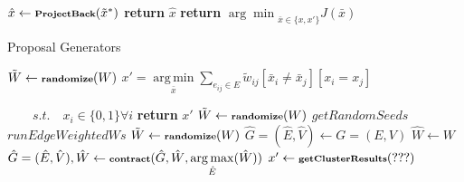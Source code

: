 \documentclass[10pt,twocolumn,letterpaper]{article}
\DeclareMathOperator*{\argmin}{arg\,min}
\DeclareMathOperator*{\argmax}{arg\,max}
\begin{document}
\begin{algorithm}
\begin{scriptsize}
\begin{algorithmic}[1]
\State $\hat{x} \gets \textbf{\scriptsize{ProjectBack}}(\tilde{x}^*)$
\State \textbf{return} $\hat{x}$
\EndProcedure
\vspace{0.3cm}
\State \textbf{return} ${\arg\min}_{\bar{x} \in \{x,x'\}}J(\bar{x})$
\EndProcedure
\end{algorithmic}
\end{scriptsize}
\end{algorithm}



\begin{algorithm}
    \begin{scriptsize}
        \caption{Proposal Generators}\label{alg:proposal_gen}   
        \begin{algorithmic}[1]
            \State $\tilde{W} \gets \textbf{\scriptsize{randomize}}(W) $
            \State $x'= \argmin\limits_{\bar{x}} \sum\limits_{e_{ij} \in E } \tilde{w}_{ij}[\bar{x}_i \neq \bar{x}_j]  [x_i = x_j]   $

            $ \quad\quad s.t.\quad x_i \in \{0, 1\} \forall i $
            \State \textbf{return} $x'$
            \EndProcedure
            \vspace{0.3cm}
            \State $\tilde{W} \gets \textbf{\scriptsize{randomize}}(W) $
            \State $ getRandomSeeds$
            \State $ runEdgeWeightedWs$
            \EndProcedure   
            \vspace{0.3cm}
            \State $\tilde{W} \gets \textbf{\scriptsize{randomize}}(W) $
            \State $\hat{G}=(\hat{E},\hat{V}) \gets G=(E,V)$
            \State $\hat{W} \gets W$
                \State $\hat{G}=(\hat{E},\hat{V}),\hat{W} \gets 
                    \textbf{\scriptsize{contract}}(\hat{G},\hat{W},  \argmax\limits_{\hat{E}}(\hat{W}) )$
            \EndWhile
            \State $x' \gets \textbf{\scriptsize{getClusterResults}}(???) $ 
            \EndProcedure
        \end{algorithmic}
    \end{scriptsize}
\end{algorithm}
\end{document}
